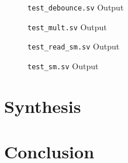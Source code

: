 


\begin{figure}[ht]
	\centering
	
	\caption{\texttt{test\_debounce.sv} Output}
	\label{fig:test-debounce}
\end{figure}




\begin{figure}[ht]
	\centering
	
	\caption{\texttt{test\_mult.sv} Output}
	\label{fig:test-mult}
\end{figure}




\begin{figure}[ht]
	\centering
	
	\caption{\texttt{test\_read\_sm.sv} Output}
	\label{fig:test-read-sm}
\end{figure}




\begin{figure}[ht]
	\centering
	
	\caption{\texttt{test\_sm.sv} Output}
	\label{fig:test-sm}
\end{figure}


\section{Synthesis}  \label{sec:synth}


\section{Conclusion}  \label{sec:conclusion}

